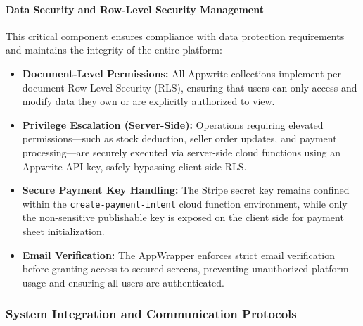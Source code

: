 \paragraph{Data Security and Row-Level Security Management}
This critical component ensures compliance with data protection requirements and maintains the integrity of the entire platform:
\begin{itemize}
    \item \textbf{Document-Level Permissions:} All Appwrite collections implement per-document Row-Level Security (RLS), ensuring that users can only access and modify data they own or are explicitly authorized to view.
    \item \textbf{Privilege Escalation (Server-Side):} Operations requiring elevated permissions—such as stock deduction, seller order updates, and payment processing—are securely executed via server-side cloud functions using an Appwrite API key, safely bypassing client-side RLS.
    \item \textbf{Secure Payment Key Handling:} The Stripe secret key remains confined within the \texttt{create-payment-intent} cloud function environment, while only the non-sensitive publishable key is exposed on the client side for payment sheet initialization.
    \item \textbf{Email Verification:} The AppWrapper enforces strict email verification before granting access to secured screens, preventing unauthorized platform usage and ensuring all users are authenticated.

\end{itemize}

\subsubsection{System Integration and Communication Protocols}

